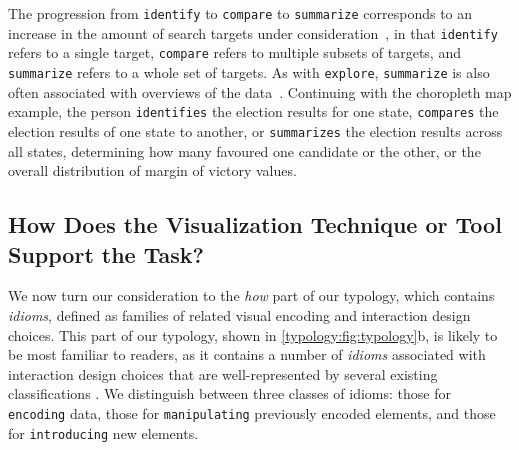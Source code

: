 The progression from {\tt identify} to {\tt compare} to {\tt summarize} corresponds to an increase in the amount of search targets under consideration~\cite{Andrienko2006,Buja1996,Tweedie1997}, in that {\tt identify} refers to a single target, {\tt compare} refers to multiple subsets of targets, and {\tt summarize} refers to a whole set of targets.
As with {\tt explore}, {\tt summarize} is also often associated with overviews of the data~\cite{Lee2006}.
Continuing with the choropleth map example, the person {\tt identifies} the election results for one state, {\tt compares} the election results of one state to another, or {\tt summarizes} the election results across all states, determining how many favoured one candidate or the other, or the overall distribution of margin of victory values.


\subsection{How Does the Visualization Technique or Tool Support the Task?}
\label{typology:how}



We now turn our consideration to the {\it how} part of our typology, which contains {\it idioms}, defined as families of related visual encoding and interaction design choices.
This part of our typology, shown in \autoref{typology:fig:typology}b, is likely to be most familiar to readers, as it contains a number of {\it idioms} associated with interaction design choices that are well-represented by several existing classifications \cite{Gotz2008,Mullins1993,Roth2012,Roth2013,Yi2007}.
We distinguish between three classes of idioms: those for {\tt encoding} data, those for {\tt manipulating} previously encoded elements, and those for {\tt introducing} new elements.

